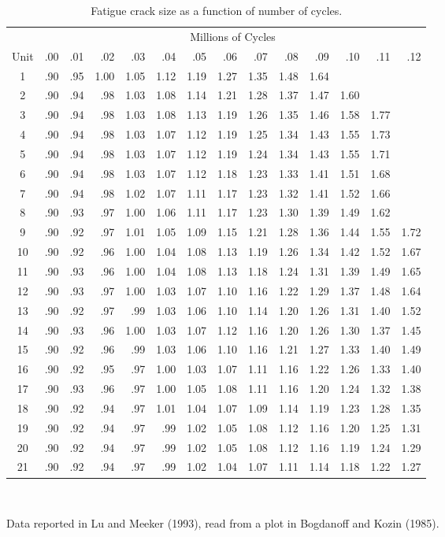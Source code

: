 \begin{table}
\caption{Fatigue crack size as a function of number of cycles.}
\centering\small
\begin{tabular}{c@{\hspace{3em}}rrr rrr rrr rrr r}
\\[-.5ex]
\hline
 & \multicolumn{13}{c}{Millions of Cycles} \\
Unit& .00& .01& .02& .03& .04& .05& .06& .07& .08& .09& .10& .11& .12 \\
\hline
 1& .90& .95&1.00&1.05&1.12&1.19&1.27&1.35&1.48&1.64 \\
 2& .90& .94& .98&1.03&1.08&1.14&1.21&1.28&1.37&1.47&1.60 \\
 3& .90& .94& .98&1.03&1.08&1.13&1.19&1.26&1.35&1.46&1.58&1.77 \\
 4& .90& .94& .98&1.03&1.07&1.12&1.19&1.25&1.34&1.43&1.55&1.73 \\
 5& .90& .94& .98&1.03&1.07&1.12&1.19&1.24&1.34&1.43&1.55&1.71 \\
 6& .90& .94& .98&1.03&1.07&1.12&1.18&1.23&1.33&1.41&1.51&1.68 \\
 7& .90& .94& .98&1.02&1.07&1.11&1.17&1.23&1.32&1.41&1.52&1.66 \\
 8& .90& .93& .97&1.00&1.06&1.11&1.17&1.23&1.30&1.39&1.49&1.62 \\
 9& .90& .92& .97&1.01&1.05&1.09&1.15&1.21&1.28&1.36&1.44&1.55&1.72 \\
10& .90& .92& .96&1.00&1.04&1.08&1.13&1.19&1.26&1.34&1.42&1.52&1.67 \\
11& .90& .93& .96&1.00&1.04&1.08&1.13&1.18&1.24&1.31&1.39&1.49&1.65 \\
12& .90& .93& .97&1.00&1.03&1.07&1.10&1.16&1.22&1.29&1.37&1.48&1.64 \\
13& .90& .92& .97& .99&1.03&1.06&1.10&1.14&1.20&1.26&1.31&1.40&1.52 \\
14& .90& .93& .96&1.00&1.03&1.07&1.12&1.16&1.20&1.26&1.30&1.37&1.45 \\
15& .90& .92& .96& .99&1.03&1.06&1.10&1.16&1.21&1.27&1.33&1.40&1.49 \\
16& .90& .92& .95& .97&1.00&1.03&1.07&1.11&1.16&1.22&1.26&1.33&1.40 \\
17& .90& .93& .96& .97&1.00&1.05&1.08&1.11&1.16&1.20&1.24&1.32&1.38 \\
18& .90& .92& .94& .97&1.01&1.04&1.07&1.09&1.14&1.19&1.23&1.28&1.35 \\
19& .90& .92& .94& .97& .99&1.02&1.05&1.08&1.12&1.16&1.20&1.25&1.31 \\
20& .90& .92& .94& .97& .99&1.02&1.05&1.08&1.12&1.16&1.19&1.24&1.29 \\
21& .90& .92& .94& .97& .99&1.02&1.04&1.07&1.11&1.14&1.18&1.22&1.27 \\
\hline
\end{tabular}\\
\begin{minipage}[t]{4in}
Data reported in Lu and Meeker (1993),
read from a plot in Bogdanoff and Kozin (1985).
\end{minipage}
\label{atable:bk.fatigue.data}
\end{table}

